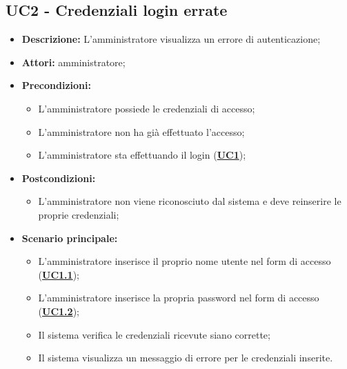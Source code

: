 \subsection{UC2 - Credenziali login errate}
\label{sec:UC2}
\begin{itemize}
	\item \textbf{Descrizione:} L’amministratore visualizza un errore di autenticazione;
	\item \textbf{Attori:} amministratore;
	\item \textbf{Precondizioni:} 
	\begin{itemize}
		\item L’amministratore possiede le credenziali di accesso;
		\item L’amministratore non ha già effettuato l’accesso;
		\item L’amministratore sta effettuando il login (\hyperref[sec:UC1]{\textbf{UC1}});
	\end{itemize}
	\item \textbf{Postcondizioni:}
	\begin{itemize}
		\item L’amministratore non viene riconosciuto dal sistema e deve reinserire le proprie credenziali;
	\end{itemize}
	\item \textbf{Scenario principale:} 
	\begin{itemize}
		\item L’amministratore inserisce il proprio nome utente nel form di accesso (\hyperref[sec:UC1.1]{\textbf{UC1.1}});
		\item L’amministratore inserisce la propria password nel form di accesso (\hyperref[sec:UC1.2]{\textbf{UC1.2}});
		\item Il sistema verifica le credenziali ricevute siano corrette;
		\item Il sistema visualizza un messaggio di errore per le credenziali inserite.
	\end{itemize}
\end{itemize}

